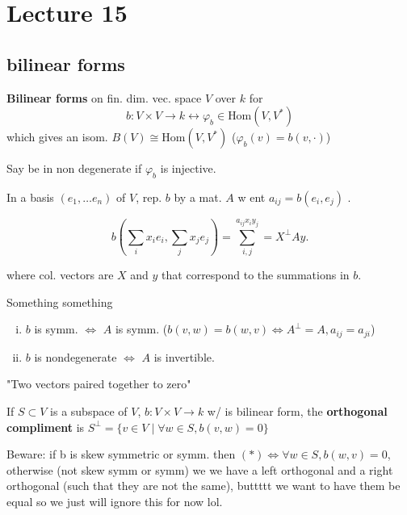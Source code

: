 \documentclass{article}
\begin{document}

\section{Lecture 15}

%

\subsection{bilinear forms}

\textbf{Bilinear forms} on fin. dim. vec. space \( V \) over \( k \) for
\[ b: V \times  V \to k \longleftrightarrow  \varphi _b \in  \text{Hom}(V,V^*)\]
which gives an isom. \( B(V) \cong \text{Hom}(V,V^*) \) (\( \varphi  _b (v)=b(v,\cdot) \))

Say be in non degenerate if \( \varphi_b  \) is injective. 

In a basis \( (e_{1},\ldots e_n) \) of \( V \), rep. \( b \) by a mat. \( A \) w ent \( a_{ij}=b(e_i,e_j) \) .

\[
  b(\sum_i x_ie_i,\sum_jx_je_j) = \displaystyle\sum_{i,j}^{ a_{ij}x_iy_j}=X^{\perp}Ay
.\] 

where col. vectors are \( X \) and \( y \) that correspond to the summations in \( b \). 


Something something
\begin{enumerate}[i.]
  \item \( b \) is symm. \( \iff \) \( A \) is symm. (\( b(v,w)=b(w,v) \iff A^{\perp}=A, a_{ij}=a_{ji} \))
  \item \( b \) is nondegenerate \( \iff \) \( A \) is invertible. 
\end{enumerate}


 "Two vectors paired together to zero"

\begin{definition}[Orthogonality]
  If \( S \subset V \) is a subspace of \( V \), \( b:V\times V \to k \) w/ is bilinear form, the \textbf{orthogonal compliment} is \( S^{\perp}=\{v \in  V \mid  \forall w \in  S, b(v,w)=0 \} \)
\end{definition}

Beware: if b is skew symmetric or symm. then \( (*)\iff \forall w \in  S, b(w,v)=0 \), otherwise (not skew symm or symm) we we have a left orthogonal and a right orthogonal (such that they are not the same), buttttt we want to have them be equal so we just will ignore this for now lol. 
\end{document}
